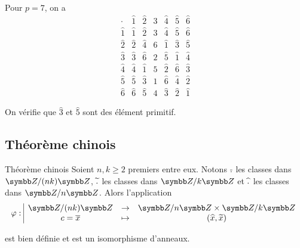 \begin{exemple}
    Pour $p = 7$, on a 
    \[
        \begin{array}{c|cccccc}
            \cdot & \widehat{1} & \widehat{2} & \widehat{3} & \widehat{4} & \widehat{5} & \widehat{6} \\
            \hline
            \widehat{1} & \widehat{1} & \widehat{2} & \widehat{3} & \widehat{4} & \widehat{5} & \widehat{6} \\
            \widehat{2} & \widehat{2} & \widehat{4} & \widehat{6} & \widehat{1} & \widehat{3} & \widehat{5} \\
            \widehat{3} & \widehat{3} & \widehat{6} & \widehat{2} & \widehat{5} & \widehat{1} & \widehat{4} \\
            \widehat{4} & \widehat{4} & \widehat{1} & \widehat{5} & \widehat{2} & \widehat{6} & \widehat{3} \\
            \widehat{5} & \widehat{5} & \widehat{3} & \widehat{1} & \widehat{6} & \widehat{4} & \widehat{2} \\
            \widehat{6} & \widehat{6} & \widehat{5} & \widehat{4} & \widehat{3} & \widehat{2} & \widehat{1} 
        \end{array}
    \]

    On vérifie que $\widehat 3$ et $\widehat 5$ sont des élément primitif.
\end{exemple}


\subsection{Théorème chinois }

\begin{theoreme}{Théorème chinois}{}
    Soient $n, k \geqslant 2$ premiers entre eux. Notons $\overline{.} \space $ les 
    classes dans $\Z / (n k) \Z$, $\widetilde{.}\space $ les classes dans $\Z / k \Z$ et 
    $\space \widehat{.} \space $ les classes dans $\Z / n \Z$.
    Alors l'application 
    \[\fonction{\varphi}{\Z / (n k) \Z}{\Z / n \Z \times \Z / k \Z}{c = \overline x}{(\widehat x, \widetilde x)}\]

    est bien définie et est un isomorphisme d'anneaux.
\end{theoreme}

